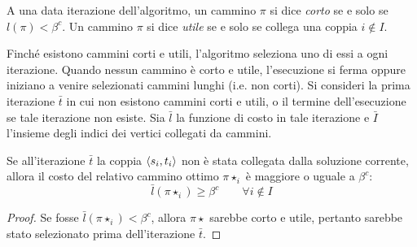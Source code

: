 \begin{algorithm}
	\caption{\PricedDisjointPaths}
	\label{algo:PricedDisjointPaths}
	
\end{algorithm}

A una data iterazione dell'algoritmo, un cammino $\pi$ si dice \emph{corto} se e solo se $l(\pi)<\beta^c$.
Un cammino $\pi$ si dice \emph{utile} se e solo se collega una coppia $i\notin I$.

Finché esistono cammini corti e utili, l'algoritmo seleziona uno di essi a ogni iterazione.
Quando nessun cammino è corto e utile, l'esecuzione si ferma oppure iniziano a venire selezionati cammini lunghi (i.e. non corti).
Si consideri la prima iterazione $\bar t$ in cui non esistono cammini corti e utili, o il termine dell'esecuzione se tale iterazione non esiste.
Sia $\bar l$ la funzione di costo in tale iterazione e $\bar I$ l'insieme degli indici dei vertici collegati da cammini.

\begin{lemma}\label{lem:priceddpaths_non_included_non_short}
	Se all'iterazione $\bar t$ la coppia $\langle s_i,t_i \rangle$ non è stata collegata dalla soluzione corrente, allora il costo del relativo cammino ottimo $\pi\star_i$ è maggiore o uguale a $\beta^c$:
	\begin{equation*}
		\bar l(\pi\star_i)\geq\beta^c\qquad\forall i\notin I
	\end{equation*}
\end{lemma}
\begin{proof}
	Se fosse $\bar l(\pi\star_i)<\beta^c$, allora $\pi\star$ sarebbe corto e utile, pertanto sarebbe stato selezionato prima dell'iterazione $\bar t$.
\end{proof}

